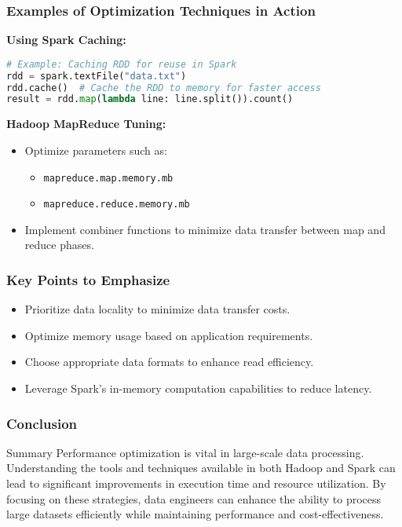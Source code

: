 \documentclass[aspectratio=169]{beamer}
\begin{document}
\begin{frame}[fragile]
    \frametitle{Examples of Optimization Techniques in Action}
    
    \textbf{Using Spark Caching:}
    \begin{lstlisting}[language=Python]
# Example: Caching RDD for reuse in Spark
rdd = spark.textFile("data.txt")
rdd.cache()  # Cache the RDD to memory for faster access
result = rdd.map(lambda line: line.split()).count()
    \end{lstlisting}
    
    \textbf{Hadoop MapReduce Tuning:}
    \begin{itemize}
        \item Optimize parameters such as:
        \begin{itemize}
            \item \texttt{mapreduce.map.memory.mb}
            \item \texttt{mapreduce.reduce.memory.mb}
        \end{itemize}
        \item Implement combiner functions to minimize data transfer between map and reduce phases.
    \end{itemize}
\end{frame}

\begin{frame}
    \frametitle{Key Points to Emphasize}
    \begin{itemize}
        \item Prioritize data locality to minimize data transfer costs.
        \item Optimize memory usage based on application requirements.
        \item Choose appropriate data formats to enhance read efficiency.
        \item Leverage Spark's in-memory computation capabilities to reduce latency.
    \end{itemize}
\end{frame}

\begin{frame}
    \frametitle{Conclusion}
    \begin{block}{Summary}
        Performance optimization is vital in large-scale data processing. 
        Understanding the tools and techniques available in both Hadoop and Spark can lead to significant improvements in execution time and resource utilization. 
        By focusing on these strategies, data engineers can enhance the ability to process large datasets efficiently while maintaining performance and cost-effectiveness.
    \end{block}
\end{frame}
\end{document}
